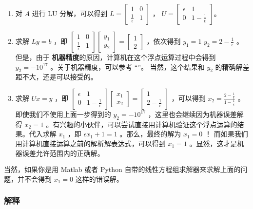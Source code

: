 \begin{enumerate}
\item 对  $A$  进行 LU 分解，可以得到  $L=\begin{bmatrix} 1& 0\\ \frac{1}{\epsilon} & 1 \end{bmatrix}$  ，  $U=\begin{bmatrix} \epsilon & 1\\ 0 & 1-\frac{1}{\epsilon} \end{bmatrix}$。
\item  求解  $Ly=b$  ，即  $\begin{bmatrix} 1& 0\\ \frac{1}{\epsilon} & 1 \end{bmatrix} \begin{bmatrix} y_1\\ y_2 \end{bmatrix}= \begin{bmatrix} 1\\ 2 \end{bmatrix}$  ，依次得到  $y_1=1$   $y_2=2-\frac{1}{\epsilon}$  。但是，由于	\textbf{机器精度}的原因，计算机在这个浮点运算过程中会得到  $y_2=-10^{17}$  。关于机器精度，可以参考 “”。 当然，这个结果和  $y_2$  的精确解差距不大，还是可以接受的。
\item 求解  $Ux=y$  ，即  $\begin{bmatrix} \epsilon& 1\\ 0 &1-\frac{1}{\epsilon}  \end{bmatrix} \begin{bmatrix} x_1\\ x_2 \end{bmatrix}= \begin{bmatrix} 1\\ 2-\frac{1}{\epsilon} \end{bmatrix}$  ，可以得到  $x_2=\frac{2-\frac{1}{\epsilon}}{1-\frac{1}{\epsilon}}$  。即使我们不使用上面一步得到的  $y_2=-10^{17}$  ，这里也会继续因为机器误差解得  $x_2=1$  。有兴趣的小伙伴，可以尝试直接用计算机验证这个浮点运算的结果。代入求解  $x_1$  ，即  $\epsilon x_1+1=1$  。那么，最终的解为  $x_1=0$ ！ 而如果我们用计算机直接运算之前的解析解表达式，可以得到  $x_1=1$  。显然，这才是机器误差允许范围内的正确解。
\end{enumerate}

当然，如果你是用 Matlab 或者 Python 自带的线性方程组求解器来求解上面的问题，并不会得到  $x_1=0$  这样的错误解。

\subsubsection{解释}

